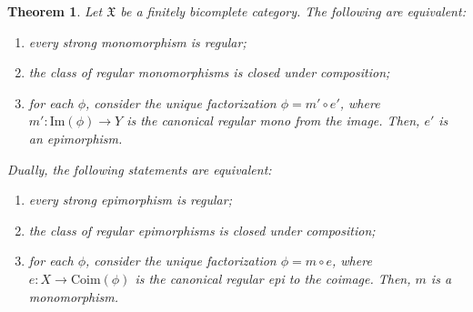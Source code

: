 \documentclass[12pt]{article}
\newtheorem{theorem}[lemma]{Theorem}
\theoremstyle{definition}
\def\X{\mathfrak X}
\def\Coim{\mathrm{Coim}}
\def\Im{\mathrm{Im}}
\numberwithin{equation}{section}
\begin{document}
\begin{theorem}\label{thm_main}
Let $\X$ be a finitely bicomplete category. The following are equivalent:
\begin{enumerate}[\rm (1)]
\item every strong monomorphism is regular;
\item the class of regular monomorphisms is closed under composition;
\item for each $\phi$, consider the unique factorization $\phi=m'\circ e'$, where $m'\colon \Im(\phi)\to Y$ is the canonical regular mono from the image. Then, $e'$ is an epimorphism.
\end{enumerate}
Dually, the following statements are equivalent:
\begin{enumerate}[\rm (1$'$)]
\item every strong epimorphism is regular;
\item the class of regular epimorphisms is closed under composition;
\item for each $\phi$, consider the unique factorization $\phi=m\circ e$, where $e\colon X\to\Coim(\phi)$ is the canonical regular epi to the coimage. Then, $m$ is a monomorphism.
\end{enumerate}
\end{theorem}
\end{document}
